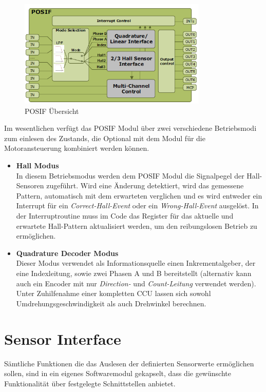 \begin{figure}[h]
\centering
\includegraphics[width=0.8\textwidth]{sensor/posif_overview.PNG}
\caption{POSIF Übersicht}
\label{img:posif_overview}
\end{figure}

Im wesentlichen verfügt das POSIF Modul über zwei verschiedene Betriebsmodi zum einlesen des Zustands, die Optional mit dem Modul für die Motoransteuerung kombiniert werden können.

\begin{itemize}
\item \textbf{Hall Modus} \\
In diesem Betriebsmodus werden dem POSIF Modul die Signalpegel der Hall-Sensoren zugeführt. Wird eine Änderung detektiert, wird das gemessene Pattern, automatisch mit dem erwarteten verglichen und es wird entweder ein Interrupt für ein \textit{Correct-Hall-Event} oder ein \textit{Wrong-Hall-Event} ausgelöst. In der Interruptroutine muss im Code das Register für das aktuelle und erwartete Hall-Pattern aktualisiert werden, um den reibungslosen Betrieb zu ermöglichen.
\item \textbf{Quadrature Decoder Modus} \\
Dieser Modus verwendet als Informationsquelle einen Inkrementalgeber, der eine Indexleitung, sowie zwei Phasen A und B bereitstellt (alternativ kann auch ein Encoder mit nur \textit{Direction-} und \textit{Count-Leitung} verwendet werden). Unter Zuhilfenahme einer kompletten CCU lassen sich sowohl Umdrehungsgeschwindigkeit als auch Drehwinkel berechnen.
\end{itemize}

\section{Sensor Interface}
Sämtliche Funktionen die das Auslesen der definierten Sensorwerte ermöglichen sollen, sind in ein eigenes Softwaremodul gekapselt, dass die gewünschte Funktionalität über festgelegte Schnittstellen anbietet. \\

